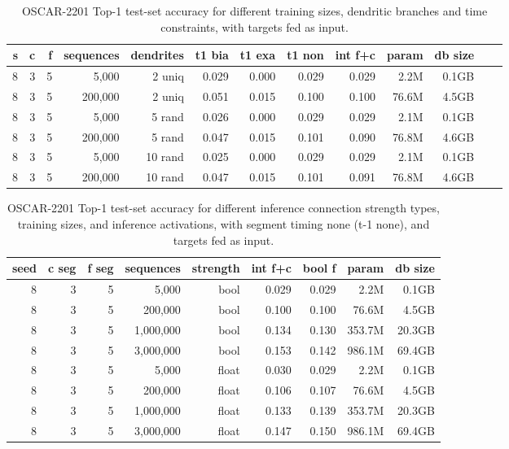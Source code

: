 \begin{table}[H]
\centering
\caption{OSCAR-2201 Top-1 test-set accuracy for different training sizes, dendritic branches and time constraints, with targets fed as input.}
\label{tab:oscar-test-top1-accuracy-spacyPipelineOptimisations-multipleDendriticBranches}
\begin{tabular}{rrrrrrrrrrrrr}
\toprule
\textbf{s} & \textbf{c} & \textbf{f} & \textbf{sequences} & \textbf{dendrites} & \textbf{t1 bia} & \textbf{t1 exa} & \textbf{t1 non} & \textbf{int f+c}  & \textbf{param} & \textbf{db size} \\
\midrule
8 & 3 & 5 & 5,000     & 2 uniq & 0.029 & 0.000 & 0.029 & 0.029 & 2.2M & 0.1GB \\
8 & 3 & 5 & 200,000   & 2 uniq & 0.051 & 0.015 & 0.100 & 0.100 & 76.6M & 4.5GB \\
8 & 3 & 5 & 5,000     & 5 rand & 0.026 & 0.000 & 0.029 & 0.029 & 2.1M & 0.1GB \\	%
8 & 3 & 5 & 200,000   & 5 rand & 0.047 & 0.015 & 0.101 & 0.090 & 76.8M & 4.6GB \\	%
8 & 3 & 5 & 5,000     & 10 rand & 0.025 & 0.000 & 0.029 & 0.029 & 2.1M & 0.1GB \\
8 & 3 & 5 & 200,000   & 10 rand & 0.047 & 0.015 & 0.101 & 0.091 & 76.8M & 4.6GB \\
\bottomrule
\end{tabular}
\end{table}

\begin{table}[H]
\centering
\caption{OSCAR-2201 Top-1 test-set accuracy for different inference connection strength types, training sizes, and inference activations, with segment timing none (t-1 none), and targets fed as input.}
\label{tab:oscar-test-top1-accuracy-spacyPipelineOptimisations-inferenceConnectionStrengthTypes}
\begin{tabular}{rrrrrrrrr}
\toprule
\textbf{seed} & \textbf{c seg} & \textbf{f seg} & \textbf{sequences} & \textbf{strength} & \textbf{int f+c} & \textbf{bool f} & \textbf{param} & \textbf{db size} \\
\midrule
8 & 3 & 5 & 5,000     & bool & 0.029 & 0.029 & 2.2M & 0.1GB \\
8 & 3 & 5 & 200,000   & bool & 0.100 & 0.100 & 76.6M & 4.5GB \\
8 & 3 & 5 & 1,000,000 & bool & 0.134 & 0.130 & 353.7M & 20.3GB \\
8 & 3 & 5 & 3,000,000 & bool & 0.153 & 0.142 & 986.1M & 69.4GB \\
8 & 3 & 5 & 5,000     & float & 0.030 & 0.029 & 2.2M & 0.1GB \\
8 & 3 & 5 & 200,000   & float & 0.106 & 0.107 & 76.6M & 4.5GB \\
8 & 3 & 5 & 1,000,000 & float & 0.133 & 0.139 & 353.7M & 20.3GB \\
8 & 3 & 5 & 3,000,000 & float & 0.147 & 0.150 & 986.1M & 69.4GB \\
\bottomrule
\end{tabular}
\end{table}

